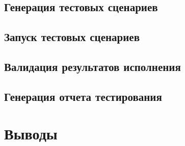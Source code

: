 \documentclass[14pt, openany]{book}
\begin{document}
\section{Генерация тестовых сценариев}

\section{Запуск тестовых сценариев}

\section{Валидация результатов исполнения}

\section{Генерация отчета тестирования}

\chapter{Выводы}



\end{document}
